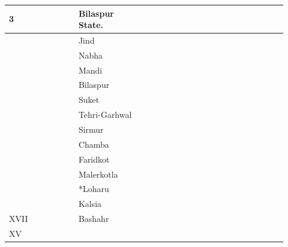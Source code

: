 \begin{longtable}{|p{0.23\linewidth}|p{0.23\linewidth}|p{0.23\linewidth}|p{0.23\linewidth}|}
{3















} & \multirow{14}{*}{











Bilaspur State.















} \\
\hline
 & Jind

 \\
\hline
 & Nabha

 \\
\hline
 & Mandi

 \\
\hline
 & Bilaspur

 \\
\hline
 & Suket

 \\
\hline
 & Tehri-Garhwal

 \\
\hline
 & Sirmur

 \\
\hline
 & Chamba

 \\
\hline
 & Faridkot

 \\
\hline
 & Malerkotla

 \\
\hline
 & *Loharu

 \\
\hline
 & Kalsia

 \\
\hline
XVII

 & Bashahr

 \\
\hline
\multirow{13}{*}{XV











}
\end{longtable}
